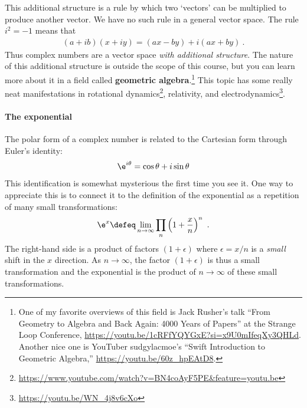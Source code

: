 This additional structure is a rule by which two `vectors' can be multiplied to produce another vector. We have no such rule in a general vector space. The rule $i^2 = -1$ means that
\begin{align}
    (a+ib)(x+iy) = (ax - by) + i (ax + by) \ .
\end{align}
Thus complex numbers are a vector space \emph{with additional structure}. The nature of this additional structure is outside the scope of this course, but you can learn more about it in a field called \textbf{geometric algebra}.\footnote{One of my favorite overviews of this field is Jack Rusher's talk ``From Geometry to Algebra and Back Again: 4000 Years of Papers'' at the Strange Loop Conference, \url{https://youtu.be/1cRFfYQYGxE?si=x9U0mIfeqXy3QHLd}. Another nice one is YouTuber sudgylacmoe's ``Swift Introduction to Geometric Algebra,'' \url{https://youtu.be/60z_hpEAtD8}.}\autocite{Doran:2007tqa} This topic has some really neat manifestations in rotational dynamics\footnote{\url{https://www.youtube.com/watch?v=BN4coAyF5PE&feature=youtu.be}}\autocite{10.1119/5.0109883}, relativity\autocite{10.1119/1.4734014}, and electrodynamics\footnote{\url{https://youtu.be/WN_4j8v6cXo}}\autocite{Dressel:2014fna}.

\paragraph{The exponential}
The polar form of a complex number is related to the Cartesian form through Euler's identity:
\begin{align}
    \e^{i\theta} = \cos\theta + i\sin\theta
\end{align}
This identification is somewhat mysterious the first time you see it. One way to appreciate this is to connect it to the definition of the exponential as a repetition of many small transformations:
\begin{align}
    \e^x \defeq \lim_{n\to\infty} 
    \prod _n \left(1+\frac{x}{n}\right)^n \ .
\end{align}
The right-hand side is a product of factors $(1+\epsilon)$ where $\epsilon = x/n$ is a \emph{small} shift in the $x$ direction. As $n\to\infty$, the factor $(1+\epsilon)$ is thus a small transformation and the exponential is the product of $n\to\infty$ of these small transformations. 

